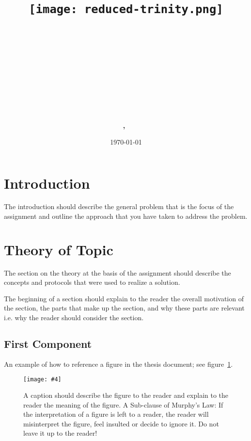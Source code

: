 \documentclass{article}
\title{
\vspace{-1in}
\begin{figure}[!ht]
\flushleft
\texttt{[image: reduced-trinity.png]}
\end{figure}
\vspace{-0.5cm}
\hrulefill \\
\vspace{0.5cm}
\textmd{\textbf{\moduleCode\ \moduleName}}\\
\textmd{\textbf{\assignmentTitle}}\\
\vspace{0.5cm}
\hrulefill \\
}
\author{\textbf{\authorName,\ \authorID}}
\date{\today}
\newcommand{\includefigure}[4]{
\begin{figure}[htb]
\centering
\texttt{[image: \#4]}
\captionsetup{width=.8\linewidth} 
\caption[#2]{#3}
\label{#1}
\end{figure}
}
\begin{document}
\lstset{language=Python, captionpos=b, frame=single}
\captionsetup{width=.8\linewidth} 

\maketitle
\tableofcontents
\vspace{0.5in}

\section{Introduction}
\label{sec:Intro}

The introduction should describe the general problem that is the focus of the assignment and outline the approach that you have taken to address the problem.


\section{Theory of Topic}
\label{sec:Theory}

The section on the theory at the basis of the assignment should describe the concepts and protocols that were used to realize a solution. 

The beginning of a section should explain to the reader the overall motivation of the section, the parts that make up the section, and why these parts are relevant i.e. why the reader should consider the section.


\subsection{First Component}


An example of how to reference a figure in the thesis document; see figure~\ref{fig:ImageOfAChick}.

\includefigure{fig:ImageOfAChick}{An Image of a chick}{A caption should describe the figure to the reader and explain to the reader the meaning of the figure. A Sub-clause of Murphy's Law: If the interpretation of a figure is left to a reader, the reader will misinterpret the figure, feel insulted or decide to ignore it. Do not leave it up to the reader!}{image.png}
\end{document}

